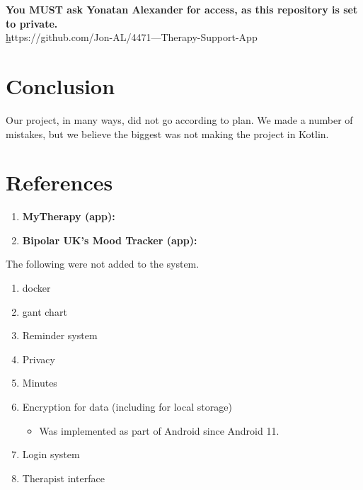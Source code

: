 \documentclass[11pt]{article}
\begin{document}
    \textbf{You MUST ask Yonatan Alexander for access, as this repository is set to private.}\\

    \href{Group Therapy-Support-App}
    https://github.com/Jon-AL/4471---Therapy-Support-App


    \section{Conclusion}\label{sec:conclusion}

    Our project, in many ways, did not go according to plan.
    We made a number of mistakes, but we believe the biggest was not making the project in Kotlin.


    \section{References}\label{sec:reference}

    \begin{enumerate}
        \item \textbf{MyTherapy (app):} \cite{MyTherapy}
        \item \textbf{Bipolar UK’s Mood Tracker (app):} \cite{BiPolUK}
    \end{enumerate}

    

    \printbibliography[heading=subbibintoc]



    \begin{figure}
        \label{fig:Gant Chart} %
    \end{figure}




    The following were not added to the system.

    \begin{enumerate}
        \item docker
        \item gant chart
        \item Reminder system
        \item Privacy
        \item Minutes
        \item Encryption for data (including for local storage)
        \begin{itemize}
            \item Was implemented as part of Android since Android 11.
        \end{itemize}
        \item Login system
        \item Therapist interface
    \end{enumerate}
\end{document}
